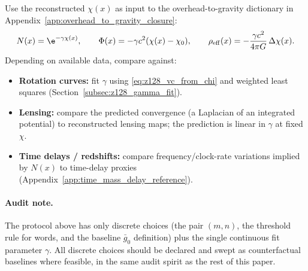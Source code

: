 Use the reconstructed $\chi(x)$ as input to the overhead-to-gravity dictionary in Appendix~\ref{app:overhead_to_gravity_closure}:
\[
N(x)=\e^{-\gamma\chi(x)},
\qquad
\Phi(x)= -\gamma c^2(\chi(x)-\chi_0),
\qquad
\rho_{\mathrm{eff}}(x)=-\frac{\gamma c^2}{4\pi G}\,\Delta\chi(x).
\]
Depending on available data, compare against:
\begin{itemize}
\item \textbf{Rotation curves:} fit $\gamma$ using \eqref{eq:z128_vc_from_chi} and weighted least squares (Section~\ref{subsec:z128_gamma_fit}).
\item \textbf{Lensing:} compare the predicted convergence (a Laplacian of an integrated potential) to reconstructed lensing maps; the prediction is linear in $\gamma$ at fixed $\chi$.
\item \textbf{Time delays / redshifts:} compare frequency/clock-rate variations implied by $N(x)$ to time-delay proxies (Appendix~\ref{app:time_mass_delay_reference}).
\end{itemize}

\paragraph{Audit note.}
\AuditTag The protocol above has only discrete choices (the pair $(m,n)$, the threshold rule for words, and the baseline $\bar g_0$ definition) plus the single continuous fit parameter $\gamma$.
All discrete choices should be declared and swept as counterfactual baselines where feasible, in the same audit spirit as the rest of this paper.

